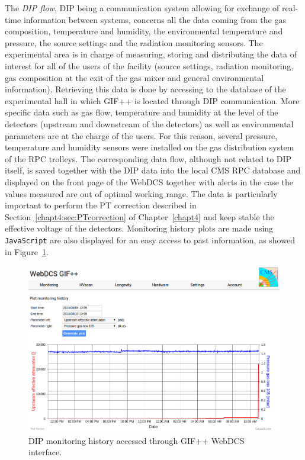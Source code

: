 	The \textit{DIP flow}, DIP being a communication system allowing for exchange of real-time information between systems, concerns all the data coming from the gas composition, temperature and humidity, the environmental temperature and pressure, the source settings and the radiation monitoring sensors. The experimental area is in charge of measuring, storing and distributing the data of interest for all of the users of the facility (source settings, radiation monitoring, gas composition at the exit of the gas mixer and general environmental information). Retrieving this data is done by accessing to the database of the experimental hall in which GIF++ is located through DIP communication. More specific data such as gas flow, temperature and humidity at the level of the detectors (upstream and downstream of the detectors) as well as environmental parameters are at the charge of the users. For this reason, several pressure, temperature and humidity sensors were installed on the gas distribution system of the RPC trolleys. The corresponding data flow, although not related to DIP itself, is saved together with the DIP data into the local CMS RPC database and displayed on the front page of the WebDCS together with alerts in the case the values measured are out of optimal working range. The data is particularly important to perform the PT correction described in Section~\ref{chapt4:sec:PTcorrection} of Chapter~\ref{chapt4} and keep stable the effective voltage of the detectors. Monitoring history plots are made using \texttt{JavaScript} are also displayed for an easy access to past information, as showed in Figure~\ref{fig:DIP-monitoring}.

	\begin{figure}[H]
        \centering
		\includegraphics[width = \plotwidth]{fig/chapt5/DIP_monitoring_history.png}
		\caption{\label{fig:DIP-monitoring} DIP monitoring history accessed through GIF++ WebDCS interface.}
	\end{figure}
	
